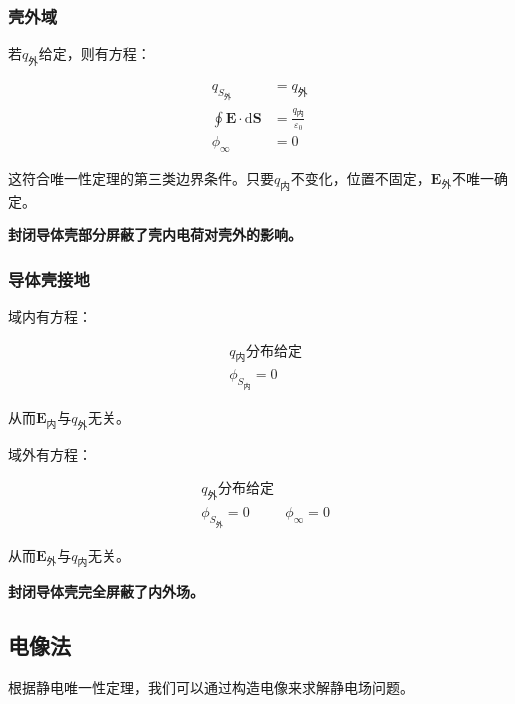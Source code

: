 \documentclass[12pt,onecolumn,a4paper]{book}
\numberwithin{table}{subsection}
\numberwithin{equation}{subsection}
\begin{document}
\subsubsection{壳外域}

若$q_\text{外}$给定，则有方程：

\begin{align}
    q_\text{$S_\text{外}$}                        & = q_\text{外}                       \\
    \oint \mathbf{E} \cdot \mathrm{d} \mathbf{S} & = \frac{q_\text{内}}{\varepsilon_0} \\
    \phi_\infty                                  & = 0
\end{align}

这符合唯一性定理的第三类边界条件。只要$q_\text{内}$不变化，位置不固定，$\mathbf{E}_\text{外}$不唯一确定。

\textbf{封闭导体壳部分屏蔽了壳内电荷对壳外的影响。}
\subsubsection{导体壳接地}

域内有方程：

\begin{align}
     & \text{$q_\text{内}$分布给定}                                     \\
     & \phi_\text{$S_\text{内}$}                                = 0
\end{align}

从而$\mathbf{E}_\text{内}$与$q_\text{外}$无关。

域外有方程：

\begin{align}
     & \text{$q_\text{外}$分布给定}                                     \\
     & \phi_\text{$S_\text{外}$}                                = 0
     & \phi_\infty                                = 0
\end{align}

从而$\mathbf{E}_\text{外}$与$q_\text{内}$无关。

\textbf{封闭导体壳完全屏蔽了内外场。}

\subsection{电像法}

根据静电唯一性定理，我们可以通过构造电像来求解静电场问题。
\end{document}
